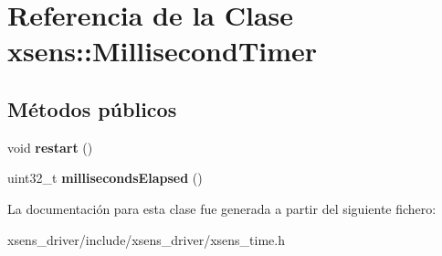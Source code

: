 \hypertarget{classxsens_1_1MillisecondTimer}{\section{\-Referencia de la \-Clase xsens\-:\-:\-Millisecond\-Timer}
\label{classxsens_1_1MillisecondTimer}
}
\subsection*{\-Métodos públicos}
\begin{DoxyCompactItemize}
\item 
\hypertarget{classxsens_1_1MillisecondTimer_a918baef8bf646b98374b9d3dea484688}{void {\bfseries restart} ()}\label{classxsens_1_1MillisecondTimer_a918baef8bf646b98374b9d3dea484688}

\item 
\hypertarget{classxsens_1_1MillisecondTimer_a3808a7da9e5ef29e4fe3fdf7f131b49a}{uint32\-\_\-t {\bfseries milliseconds\-Elapsed} ()}\label{classxsens_1_1MillisecondTimer_a3808a7da9e5ef29e4fe3fdf7f131b49a}

\end{DoxyCompactItemize}


\-La documentación para esta clase fue generada a partir del siguiente fichero\-:\begin{DoxyCompactItemize}
\item 
xsens\-\_\-driver/include/xsens\-\_\-driver/xsens\-\_\-time.\-h\end{DoxyCompactItemize}
